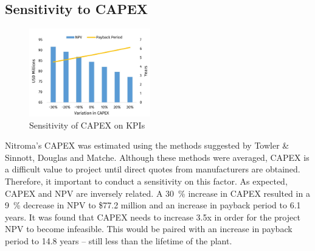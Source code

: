 \subsection{Sensitivity to CAPEX}
\begin{figure}
    \vspace{-1.1cm}
    \caption{Sensitivity of CAPEX on KPIs}
    \label{Sensitivity_CAPEX}
    \includegraphics[width=0.47\textwidth]{chapters/6-economics/figures/Sensitivity_CAPEX.jpg}
\end{figure}
Nitroma’s CAPEX was estimated using the methods suggested by Towler \& Sinnott, Douglas and Matche. Although these methods were averaged, CAPEX is a difficult value to project until direct quotes from manufacturers are obtained. Therefore, it important to conduct a sensitivity on this factor. As expected, CAPEX and NPV are inversely related. A \SI{30}{\percent} increase in CAPEX resulted in a \SI{9}{\percent} decrease in NPV to \$77.2 million and an increase in payback period to 6.1 years. It was found that CAPEX needs to increase 3.5x in order for the project NPV to become infeasible. This would be paired with an increase in payback period to 14.8 years – still less than the lifetime of the plant.

